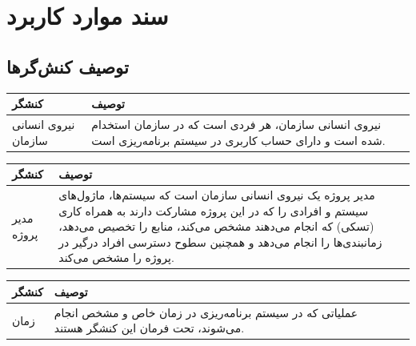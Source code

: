 
\chapter{سند موارد کاربرد}


\section{توصیف کنش‌گرها}


\begin{table}[H]
	\centering
	\begin{tabular}{|p{3cm}|p{8cm}|}
		\hline
		
		
		کنشگر	& توصیف  \\
		\hline
		
		نیروی انسانی سازمان &
		
		نیروی انسانی سازمان، هر فردی است که در سازمان استخدام شده است و دارای حساب کاربری در سیستم برنامه‌ریزی است.\\
		
		\hline
		
	\end{tabular}
\end{table}

\begin{table}[H]
	\centering
	\begin{tabular}{|p{3cm}|p{8cm}|}
		\hline
		
		
		
		کنشگر	& توصیف  \\
		\hline
		مدیر پروژه &
		
		مدیر پروژه یک نیروی انسانی سازمان است که سیستم‌ها، ماژول‌های سیستم و افرادی را که در این پروژه مشارکت دارند به همراه کاری (تسکی) که انجام می‌دهند مشخص می‌کند، منابع را تخصیص می‌دهد، زمانبندی‌ها را انجام می‌دهد و همچنین سطوح دسترسی افراد درگیر در پروژه را مشخص می‌کند.
		\\
		\hline
		
	\end{tabular}
\end{table}


\begin{table}[H]
	\centering
	\begin{tabular}{|p{3cm}|p{8cm}|}
		\hline
		
		
		کنشگر	& توصیف  \\
		\hline
		زمان &
		
		عملیاتی که در سیستم برنامه‌ریزی در زمان خاص و مشخص انجام می‌شوند، تحت فرمان این کنشگر هستند.
		\\
		\hline
		
	\end{tabular}
\end{table}

